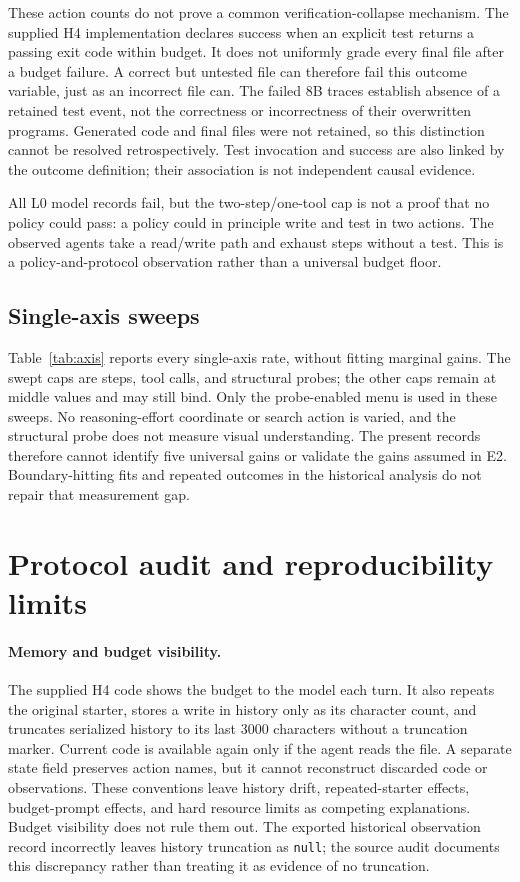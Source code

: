 \documentclass[11pt]{article}
\begin{document}
These action counts do not prove a common verification-collapse mechanism. The supplied H4 implementation declares success when an explicit test returns a passing exit code within budget. It does not uniformly grade every final file after a budget failure. A correct but untested file can therefore fail this outcome variable, just as an incorrect file can. The failed 8B traces establish absence of a retained test event, not the correctness or incorrectness of their overwritten programs. Generated code and final files were not retained, so this distinction cannot be resolved retrospectively. Test invocation and success are also linked by the outcome definition; their association is not independent causal evidence.

All L0 model records fail, but the two-step/one-tool cap is not a proof that no policy could pass: a policy could in principle write and test in two actions. The observed agents take a read/write path and exhaust steps without a test. This is a policy-and-protocol observation rather than a universal budget floor.

\subsection{Single-axis sweeps}
Table~\ref{tab:axis} reports every single-axis rate, without fitting marginal gains. The swept caps are steps, tool calls, and structural probes; the other caps remain at middle values and may still bind. Only the probe-enabled menu is used in these sweeps. No reasoning-effort coordinate or search action is varied, and the structural probe does not measure visual understanding. The present records therefore cannot identify five universal gains or validate the gains assumed in E2. Boundary-hitting fits and repeated outcomes in the historical analysis do not repair that measurement gap.

\section{Protocol audit and reproducibility limits}
\paragraph{Memory and budget visibility.}
The supplied H4 code shows the budget to the model each turn. It also repeats the original starter, stores a write in history only as its character count, and truncates serialized history to its last 3000 characters without a truncation marker. Current code is available again only if the agent reads the file. A separate state field preserves action names, but it cannot reconstruct discarded code or observations. These conventions leave history drift, repeated-starter effects, budget-prompt effects, and hard resource limits as competing explanations. Budget visibility does not rule them out. The exported historical observation record incorrectly leaves history truncation as \texttt{null}; the source audit documents this discrepancy rather than treating it as evidence of no truncation.
\end{document}

